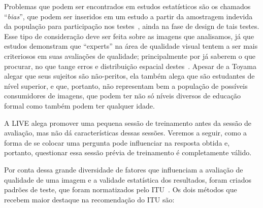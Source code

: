 Problemas que podem ser encontrados em estudos estatísticos são os chamados ``\emph{bias}'', que podem ser inseridos em um estudo a partir da amostragem indevida da população para participação nos testes~\cite{boslaugh2008}, ainda na fase de design de tais testes. Esse tipo de consideração deve ser feita sobre as imagens que analisamos, já que estudos demonstram que ``experts'' na área de qualidade visual tentem a ser mais criteriosos em suas avaliações de qualidade; principalmente por já saberem o que procurar, no que tange erros e distribuição espacial destes~\cite[p.08]{itur2012}. Apesar de a Toyama alegar que seus sujeitos são não-peritos, ela também alega que são estudantes de nível superior, e que, portanto, não representam bem a população de possíveis consumidores de imagens, que podem ter não só níveis diversos de educação formal como também podem ter qualquer idade.

A LIVE alega promover uma pequena sessão de treinamento antes da sessão de avaliação, mas não dá características dessas sessões. Veremos a seguir, como a forma de se colocar uma pergunta pode influenciar na resposta obtida e, portanto, questionar essa sessão prévia de treinamento é completamente válido.

Por conta dessa grande diversidade de fatores que influenciam a avaliação de qualidade de uma imagem e a validade estatística dos resultados, foram criados padrões de teste, que foram normatizados pelo ITU~\cite{itur2012}. Os dois métodos que recebem maior destaque na recomendação do ITU são:

